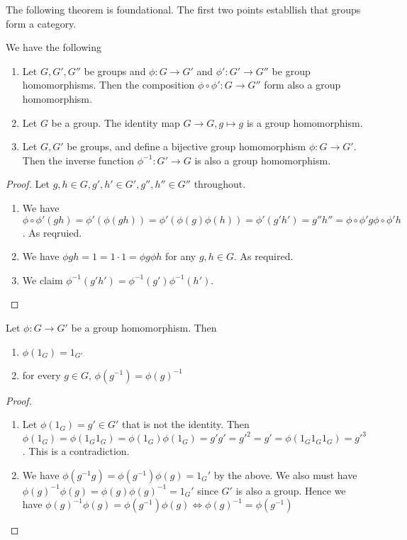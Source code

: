 The following theorem is foundational. The first two points establlish that groups form a
category. 
\begin{theorem} 
  We have the following
  \begin{enumerate}
    \item Let $G,G',G''$ be groups and $\phi:G\to G'$ and $\phi':G'\to G''$ be group
      homomorphisms. Then the composition $\phi\circ\phi':G\to G''$ form also a group
      homomorphism.
    \item Let $G$ be a group. The identity map $G\to G,g\mapsto g$ is a group
      homomorphism.
    \item Let $G,G'$ be groups, and define a bijective group homomorphism $\phi:G\to G'$.
      Then the inverse function $\phi^{-1}:G'\to G$ is also a group homomorphism.
  \end{enumerate}
  \label{groupsCategories}
\end{theorem}
\begin{proof}
  Let $g,h\in G, g',h'\in G', g'',h''\in G''$ throughout.
  \begin{enumerate}
    \item We have $\phi\circ\phi'(gh)= \phi'(\phi(gh))=
      \phi'(\phi(g)\phi(h))=\phi'(g'h')=g''h''=\phi\circ\phi'g \phi\circ\phi'h $. As
      reqruied.
    \item We have $\phi gh=1 = 1\cdot 1 = \phi g \phi h$ for any $g,h\in G$. As required.
    \item We claim $\phi^{-1}(g'h')= \phi^{-1}(g')\phi^{-1}(h')$.  

  \end{enumerate}
\end{proof}

\begin{theorem}
  Let $\phi:G\to G'$ be a group homomorphism. Then
  \begin{enumerate}
    \item $\phi(1_G)=1_{G'}$
    \item for every $g\in G$, $\phi(g^{-1})= \phi(g)^{-1}$
  \end{enumerate}
  \label{homIdInv}
\end{theorem}
\begin{proof}
  \begin{enumerate}
    \item Let $\phi(1_G)=g'\in G'$ that is not the identity. Then $\phi(1_G)=\phi(1_G
      1_G)=\phi(1_G)\phi(1_G)=g'g'=g'^2=g'=\phi(1_G1_G1_G)=g'^3$. This is a contradiction.
    \item We have $\phi(g^{-1}g)=\phi(g^{-1})\phi(g)= 1_G'$ by the above. We also must
      have $\phi(g)^{-1}\phi(g)=\phi(g)\phi(g)^{-1}=1_G'$ since $G'$ is also a group.
      Hence we have $\phi(g)^{-1}\phi(g)=\phi(g^{-1})\phi(g) \iff
      \phi(g)^{-1}=\phi(g^{-1})$
  \end{enumerate}
\end{proof}


